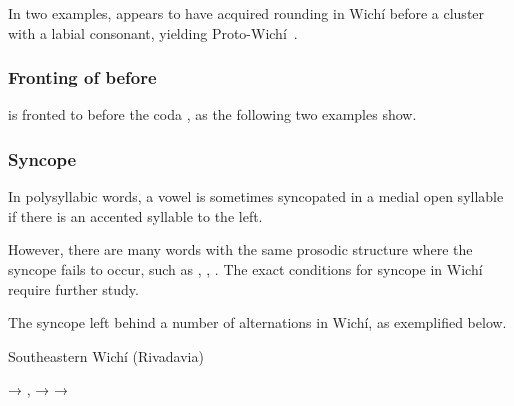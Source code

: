 In two examples,  appears to have acquired rounding in Wichí before a cluster with a labial consonant, yielding Proto-Wichí~.

\begin{exe}
    \ex \bite
    \ex \tooth
\end{exe}

\subsubsection{Fronting of  before }\label{aom-am}
 is fronted to  before the coda , as the following two examples show.

\begin{exe}
    \ex \pronominal
    \ex {}
\end{exe}

\subsubsection{Syncope}\label{wi-syncope}

In polysyllabic words, a vowel is sometimes syncopated in a medial open syllable if there is an accented syllable to the left.

\begin{exe}
    \ex \redquebracho
    \ex \gutscw
    \ex \rhea
    \ex \wildbean
    \ex \hiccup
    \ex \heartcwits
\end{exe}

However, there are many words with the same prosodic structure where the syncope fails to occur, such as , , . The exact conditions for syncope in Wichí require further study.

The syncope left behind a number of alternations in Wichí, as exemplified below.

\ea
Southeastern Wichí (Rivadavia) \citep[27–29, 40, 53]{JT09-th}\\
    \begin{xlist}
        \ex {} → , 
        \ex {} → 
        \ex {} → 
    \end{xlist}
\z
{}

